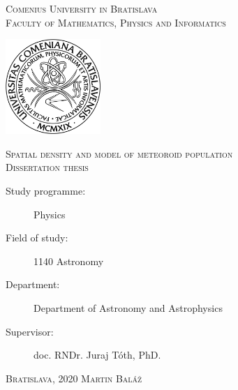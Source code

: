 \begin{titlepage}    
    \begin{center}
        {
            \Large
            \textsc{Comenius University in Bratislava}\\[2mm]
            \textsc{Faculty of Mathematics, Physics and Informatics}\\[12mm]
        }
                
		    \includegraphics[keepaspectratio = true, width = 36mm]{source/pictures/fmfi.jpg}
    \vspace{10mm}

        {
            \linespread{1.2}
            \fontsize{30}{30}\selectfont
            \textsc{Spatial density and model of meteoroid population}\\[10mm]
            
            \large
            \textsc{Dissertation thesis}
        }        
        
		    \vspace{40mm}
    {
        \footnotesize
        \begin{description}
            \item[Study programme:] Physics
            \item[Field of study:]  1140 Astronomy
            \item[Department:]      Department of Astronomy and Astrophysics
            \item[Supervisor:]      doc. RNDr. Juraj Tóth, PhD.
        \end{description}
    }

        \vfill
		{						
            \large
			\textsc{Bratislava}, 2020 \hfill \textsc{Martin Baláž}
		}
    \end{center}
\end{titlepage}
